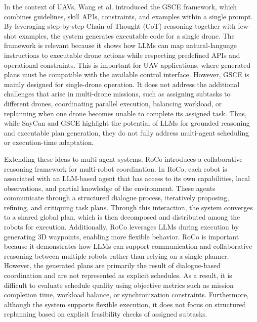 In the context of UAVs, Wang et al. \cite{wang2025gsce} introduced the GSCE framework, which combines guidelines, skill APIs,
constraints, and examples within a single prompt.
By leveraging step-by-step Chain-of-Thought (CoT) reasoning together with few-shot examples, 
the system generates executable code for a single drone.
The framework is relevant because it shows how LLMs can map natural-language instructions to executable drone actions while respecting predefined APIs and operational constraints.
This is important for UAV applications, where generated plans must be compatible with the available control interface.
However, GSCE is mainly designed for single-drone operation.
It does not address the additional challenges that arise in multi-drone missions, such as assigning subtasks to different drones, coordinating parallel execution, balancing workload, or replanning when one drone becomes unable to complete its assigned task.
Thus, while SayCan and GSCE highlight the potential of LLMs for grounded reasoning and executable plan generation, they do not fully address multi-agent scheduling or execution-time adaptation.

Extending these ideas to multi-agent systems, RoCo \cite{mandi2023roco} introduces a collaborative reasoning framework for multi-robot coordination. 
In RoCo, each robot is associated with an LLM-based agent that has access to its own capabilities, local observations, and partial knowledge of the environment.
These agents communicate through a structured dialogue process, iteratively proposing, refining, and critiquing task plans.
Through this interaction, the system converges to a shared global plan, which is then decomposed and distributed among the robots for execution.
Additionally, RoCo leverages LLMs during execution by generating 3D waypoints, enabling more flexible behavior.
RoCo is important because it demonstrates how LLMs can support communication and collaborative reasoning between multiple robots rather than relying on a single planner.
However, the generated plans are primarily the result of dialogue-based coordination and are not represented as explicit schedules.
As a result, it is difficult to evaluate schedule quality using objective metrics such as mission completion time, workload balance, or synchronization constraints.
Furthermore, although the system supports flexible execution, it does not focus on structured replanning based on explicit feasibility checks of assigned subtasks.

